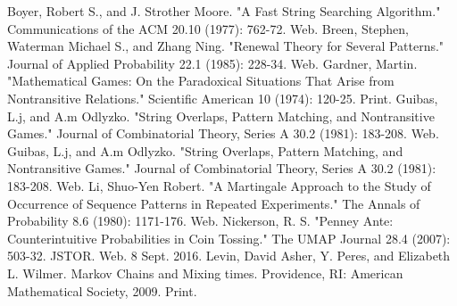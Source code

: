 \documentclass{article}
\numberwithin{mytheorem}{subsection} %
\begin{document}
	\begin{thebibliography}{1}
			Boyer, Robert S., and J. Strother Moore. "A Fast String Searching Algorithm." Communications of the ACM 20.10 (1977): 762-72. Web. 
			Breen, Stephen, Waterman Michael S., and Zhang Ning. "Renewal Theory for Several Patterns." Journal of Applied Probability 22.1 (1985): 228-34. Web.
			Gardner, Martin. "Mathematical Games: On the Paradoxical Situations That Arise from Nontransitive Relations." Scientific American 10 (1974): 120-25. Print.
			Guibas, L.j, and A.m Odlyzko. "String Overlaps, Pattern Matching, and Nontransitive Games." Journal of Combinatorial Theory, Series A 30.2 (1981): 183-208. Web.  Guibas, L.j, and A.m Odlyzko. "String Overlaps, Pattern Matching, and Nontransitive Games." Journal of Combinatorial Theory, Series A 30.2 (1981): 183-208. Web. 
			Li, Shuo-Yen Robert. "A Martingale Approach to the Study of Occurrence of Sequence Patterns in Repeated Experiments." The Annals of Probability 8.6 (1980): 1171-176. Web.
			Nickerson, R. S. "Penney Ante: Counterintuitive Probabilities in Coin Tossing." The UMAP Journal 28.4 (2007): 503-32. JSTOR. Web. 8 Sept. 2016. 
			Levin, David Asher, Y. Peres, and Elizabeth L. Wilmer. Markov Chains and Mixing times. Providence, RI: American Mathematical Society, 2009. Print. 
			
	\end{thebibliography}
\end{document}
